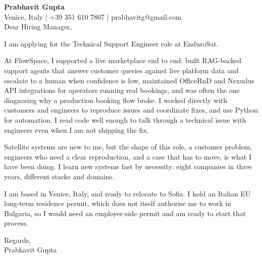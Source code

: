 \documentclass[a4paper,10.5pt]{article}
\begin{document}
\textbf{Prabhavit Gupta}\\
Venice, Italy $\vert$ +39 351 610 7807 $\vert$ prabhavitg@gmail.com\\[10pt]
Dear Hiring Manager,

I am applying for the Technical Support Engineer role at EnduroSat.

At FlowSpace, I supported a live marketplace end to end: built RAG-backed support agents that answer customer queries against live platform data and escalate to a human when confidence is low, maintained OfficeRnD and Nexudus API integrations for operators running real bookings, and was often the one diagnosing why a production booking flow broke. I worked directly with customers and engineers to reproduce issues and coordinate fixes, and use Python for automation. I read code well enough to talk through a technical issue with engineers even when I am not shipping the fix.

Satellite systems are new to me, but the shape of this role, a customer problem, engineers who need a clear reproduction, and a case that has to move, is what I have been doing. I learn new systems fast by necessity: eight companies in three years, different stacks and domains.

I am based in Venice, Italy, and ready to relocate to Sofia. I hold an Italian EU long-term residence permit, which does not itself authorise me to work in Bulgaria, so I would need an employer-side permit and am ready to start that process.

Regards,\\
Prabhavit Gupta
\end{document}
